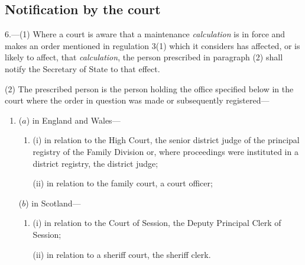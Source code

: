 \documentclass[12pt,a4paper]{article}
\begin{document}
\subsection[6. Notification by the court]{Notification by the court}

6.—(1) Where a court is aware that a maintenance 
\emph{calculation} 
is in force and makes an order mentioned in regulation 3(1) which it considers has affected, or is likely to affect, that 
\emph{calculation}, 
the person prescribed in paragraph (2) shall notify the Secretary of State to that effect.

(2) The prescribed person is the person holding the office specified below in the court where the order in question was made or subsequently registered—
\begin{enumerate}\item[]
($a$) in England and Wales—
\begin{enumerate}\item[]
(i) in relation to the High Court, the senior district judge of the principal registry of the Family Division or, where proceedings were instituted in a district registry, the district judge;

%

(ii) in relation to the family court, a court officer;
\end{enumerate}

($b$) in Scotland—
\begin{enumerate}\item[]
(i) in relation to the Court of Session, the Deputy Principal Clerk of Session;

(ii) in relation to a sheriff court, the sheriff clerk.
\end{enumerate}
\end{enumerate}
\end{document}
